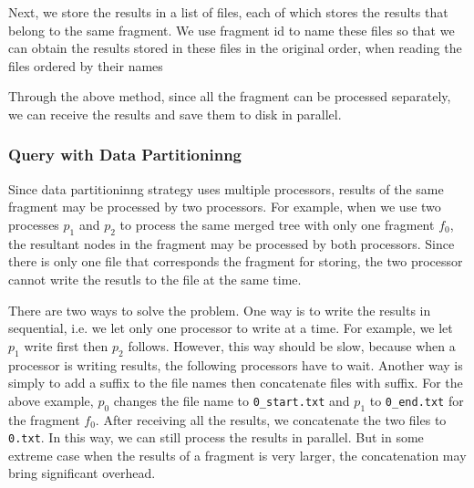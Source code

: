 Next, we store the results in a list of files, each of which stores the results
that belong to the same fragment. We use fragment id to name these files so
that we can obtain the results stored in these files in the original order, when
reading the files ordered by their names

Through the above method, since all the fragment can be processed separately, we
can receive the results and save them to disk in parallel.

\subsubsection{Query with Data Partitioninng}

Since data partitioninng strategy uses multiple processors, results of the same
fragment may be processed by two processors. For example, when we use two
processes $p_1$ and $p_2$ to process the same merged tree with only one fragment
$f_0$, the resultant nodes in the fragment may be processed by both processors.
Since there is only one file that corresponds the fragment for storing, the two
processor cannot write the resutls to the file at the same time.

There are two ways to solve the problem. One way is to write the results in
sequential, i.e. we let only one processor to write at a time. For example, we
let $p_1$ write first then $p_2$ follows. However, this way should be slow, because
when a processor is writing results, the following processors have to wait.
Another way is simply to add a suffix to the file names then concatenate files
with suffix. For the above example, $p_0$ changes the file name to
\texttt{0\_start.txt} and $p_1$ to \texttt{0\_end.txt} for the fragment $f_0$.
After receiving all the results, we concatenate the two files to \texttt{0.txt}.
In this way, we can still process the results in parallel. But in some extreme
case when the results of a fragment is very larger, the concatenation may bring
significant overhead.

